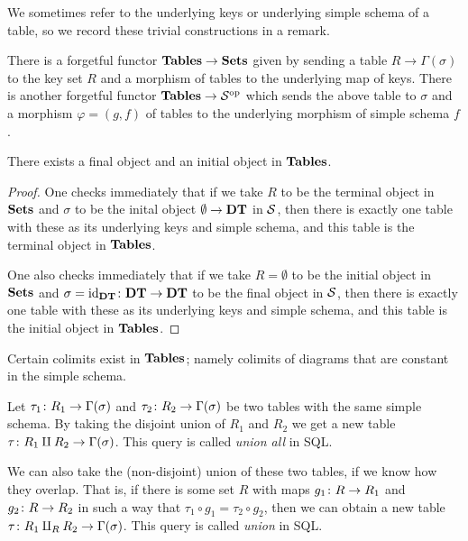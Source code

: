 \documentclass{amsart}
\begin{document}
We sometimes refer to the underlying keys or underlying simple schema of a table, so we record these trivial constructions in a remark.

\begin{remark}\label{rem:forget}

There is a forgetful functor ${\bf Tables}\rightarrow{\bf Sets}$ given by sending a table $R\to\Gamma(\sigma)$ to the key set $R$ and a morphism of tables to the underlying map of keys.  There is another forgetful functor ${\bf Tables}\rightarrow\mathcal{S}^\textnormal{op}$ which sends the above table to $\sigma$ and a morphism $\varphi=(g,f)$ of tables to the underlying morphism of simple schema $f$. 

\end{remark}

\begin{lemma}\label{final object}

There exists a final object and an initial object in ${\bf Tables}$.    

\end{lemma}

\begin{proof}

One checks immediately that if we take $R$ to be the terminal object in ${\bf Sets}$ and $\sigma$ to be the inital object $\emptyset\rightarrow{\bf DT}$ in $\mathcal{S}$, then there is exactly one table with these as its underlying keys and simple schema, and this table is the terminal object in ${\bf Tables}$.

One also checks immediately that if we take $R=\emptyset$ to be the initial object in ${\bf Sets}$ and $\sigma=\textnormal{id}_{{\bf DT}}\colon{\bf DT}\rightarrow{\bf DT}$ to be the final object in $\mathcal{S}$, then there is exactly one table with these as its underlying keys and simple schema, and this table is the initial object in ${\bf Tables}$.

\end{proof}

Certain colimits exist in ${\bf Tables}$; namely colimits of diagrams that are constant in the simple schema.

\begin{construction}

Let $\tau_1\colon R_1\rightarrow\Gamma(\sigma)$ and $\tau_2\colon R_2\rightarrow\Gamma(\sigma)$ be two tables with the same simple schema.  By taking the disjoint union of $R_1$ and $R_2$ we get a new table $\tau\colon R_1\amalg R_2\rightarrow\Gamma(\sigma)$.  This query is called {\em union all} in SQL.  

We can also take the (non-disjoint) union of these two tables, if we know how they overlap.  That is, if there is some set $R$ with maps $g_1\colon R\rightarrow R_1$ and $g_2\colon R\rightarrow R_2$ in such a way that $\tau_1\circ g_1=\tau_2\circ g_2$, then we can obtain a new table $\tau\colon R_1\amalg_RR_2\rightarrow\Gamma(\sigma)$.  This query is called {\em union} in SQL.

\end{construction}
\end{document}
